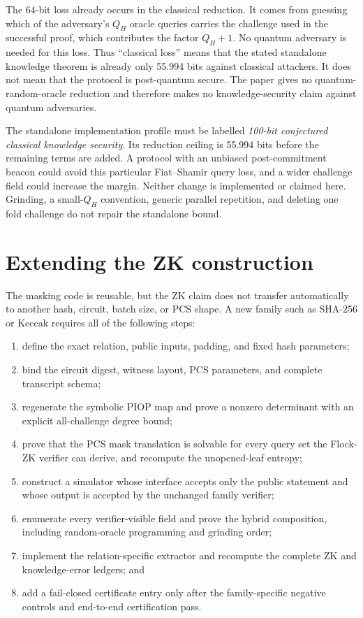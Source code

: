 \documentclass[11pt]{article}
\theoremstyle{definition}
\begin{document}
The 64-bit loss already occurs in the classical reduction.  It comes from
guessing which of the adversary's $Q_H$ oracle queries carries the challenge
used in the successful proof, which contributes the factor $Q_H+1$.  No
quantum adversary is needed for this loss.  Thus ``classical loss'' means that
the stated standalone knowledge theorem is already only 55.994 bits against
classical attackers.  It does not mean that the protocol is post-quantum
secure.  The paper gives no quantum-random-oracle reduction and therefore
makes no knowledge-security claim against quantum adversaries.

The standalone implementation profile must be labelled
\emph{100-bit conjectured classical knowledge security}.  Its reduction
ceiling is 55.994 bits before the remaining terms are added.  A protocol with
an unbiased post-commitment beacon could avoid this particular Fiat--Shamir
query loss, and a wider challenge field could increase the margin.  Neither
change is implemented or claimed here.  Grinding, a small-$Q_H$ convention,
generic parallel repetition, and deleting one fold challenge do not repair the
standalone bound.

\section{Extending the ZK construction}\label{sec:extension}

The masking code is reusable, but the ZK claim does not transfer automatically
to another hash, circuit, batch size, or PCS shape.  A new family such as
SHA-256 or Keccak requires all of the following steps:
\begin{enumerate}
\item define the exact relation, public inputs, padding, and fixed hash
      parameters;
\item bind the circuit digest, witness layout, PCS parameters, and complete
      transcript schema;
\item regenerate the symbolic PIOP map and prove a nonzero determinant with an
      explicit all-challenge degree bound;
\item prove that the PCS mask translation is solvable for every query set the
      Flock-ZK verifier can derive, and recompute the unopened-leaf entropy;
\item construct a simulator whose interface accepts only the public statement and
      whose output is accepted by the unchanged family verifier;
\item enumerate every verifier-visible field and prove the hybrid composition,
      including random-oracle programming and grinding order;
\item implement the relation-specific extractor and recompute the complete ZK
      and knowledge-error ledgers; and
\item add a fail-closed certificate entry only after the family-specific
      negative controls and end-to-end certification pass.
\end{enumerate}
\end{document}

